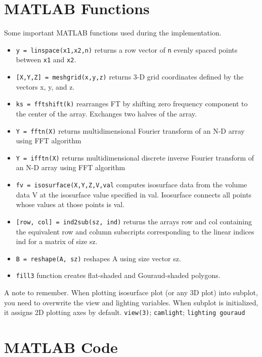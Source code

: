\documentclass{article}
\begin{document}
\pagebreak
\begin{appendices}

\section{MATLAB Functions}
Some important MATLAB functions used during the implementation.
\begin{itemize}
    \item \texttt{y = linspace(x1,x2,n)} returns a row vector of \texttt{n} evenly spaced points between \texttt{x1} and \texttt{x2}. 
    \item \texttt{[X,Y,Z] = meshgrid(x,y,z)} returns 3-D grid coordinates defined by the vectors x, y, and z.
    \item \texttt{ks = fftshift(k)} rearranges FT by shifting zero frequency component to the center of the array. Exchanges two halves of the array.
    \item \texttt{Y = fftn(X)} returns multidimensional Fourier transform of an N-D array using FFT algorithm
    \item \texttt{Y = ifftn(X)} returns multidimensional discrete inverse Fourier transform of an N-D array using FFT algorithm
    \item \texttt{fv = isosurface(X,Y,Z,V,val} computes isosurface data from the volume data V at the isosurface value specified in val. Isosurface connects all points whose values at those points is val.
    \item \texttt{[row, col] = ind2sub(sz, ind)} returns the arrays row and col containing the equivalent row and column subscripts corresponding to the linear indices ind for a matrix of size sz.
    \item \texttt{B = reshape(A, sz)} reshapes A using  size vector sz.
    \item \texttt{fill3} function creates flat-shaded and Gouraud-shaded polygons.
\end{itemize}
A note to remember. When plotting isosurface plot (or any 3D plot) into subplot, you need to overwrite the view and lighting variables. When subplot is initialized, it assigns 2D plotting axes by default. \texttt{view(3)}; \texttt{camlight}; \texttt{lighting gouraud}

\pagebreak
\section{MATLAB Code}



\end{appendices}
\end{document}
